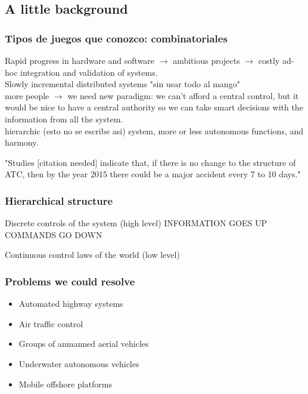





\subsection{A little background}
\begin{frame}

\frametitle{Tipos de juegos que conozco: combinatoriales}

Rapid progress in hardware and software $\rightarrow$ 
ambitious projects $\rightarrow$ costly ad-hoc integration and validation of systems. \\
Slowly incremental distributed systems "sin usar todo al mango"\\
more people $\rightarrow$ we need new paradigm: we can't afford a central control, but it would be nice to have a central authority so we can take smart decisions with the information from all the system.\\
hierarchic (esto no se escribe asi) system, more or less autonomous functions, and harmony.

"Studies [citation needed] indicate that, if there is no change to the structure of ATC, then by the year 2015 there could be a major accident every 7 to 10 days."
\end{frame}


\begin{frame}
	\frametitle{Hierarchical structure}

	Discrete controls of the system (high level)
	INFORMATION GOES UP
	COMMANDS GO DOWN	
	
	Continuous control laws of the world (low level)
\end{frame}


\begin{frame}
	\frametitle{Problems we could resolve}
\begin{itemize}
	\item Automated highway systems
	\item Air traffic control
	\item Groups of anmanned aerial vehicles
	\item Underwater autonomous vehicles
	\item Mobile offshore platforms

\end{itemize}
\end{frame}


